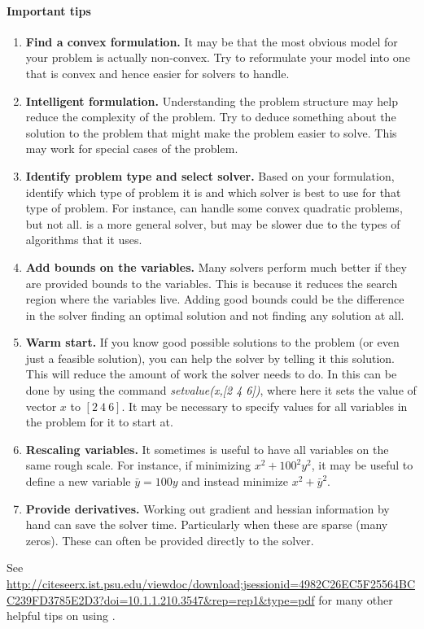 \documentclass[../open-optimization/open-optimization.tex]{subfiles}
\begin{document}
\paragraph{Important tips}
\begin{enumerate}
\item \textbf{Find a convex formulation.}  It may be that the most obvious model for your problem is actually non-convex.  Try to reformulate your model into one that is convex and hence easier for solvers to handle.
\item \textbf{Intelligent formulation.}  Understanding the problem structure may help reduce the complexity of the problem.  Try to deduce something about the solution to the problem that might make the problem easier to solve.  This may work for special cases of the problem.
\item \textbf{Identify problem type and select solver.}  Based on your formulation, identify which type of problem it is and which solver is best to use for that type of problem.  For instance, \gurobi can handle some convex quadratic problems, but not all.  \ipopt is a more general solver, but may be slower due to the types of algorithms that it uses.

\item \textbf{Add bounds on the variables.} Many solvers perform much better if they are provided bounds to the variables.  This is because it reduces the search region where the variables live.   Adding good bounds could be the difference in the solver finding an optimal solution and not finding any solution at all.
\item \textbf{Warm start.} If you know good possible solutions to the problem (or even just a feasible solution), you can help the solver by telling it this solution.  This will reduce the amount of work the solver needs to do.  In \jump this can be done by using the command \textit{setvalue(x,[2 4 6])}, where here it sets the value of vector $x$ to $[2\ 4\ 6]$.  It may be necessary to specify values for all variables in the problem for it to start at.
\item \textbf{Rescaling variables.} It sometimes is useful to have all variables on the same rough scale.  For instance, if minimizing $x^2 + 100^2 y^2$, it may be useful to define a new variable $\bar y = 100y$ and instead minimize $x^2 + \bar y^2$.
\item \textbf{Provide derivatives.} Working out gradient and hessian information by hand can save the solver time.  Particularly when these are sparse (many zeros).  These can often be provided directly to the solver.
\end{enumerate}
See \url{http://citeseerx.ist.psu.edu/viewdoc/download;jsessionid=4982C26EC5F25564BCC239FD3785E2D3?doi=10.1.1.210.3547&rep=rep1&type=pdf} for many other helpful tips on using \ipopt.
\end{document}
